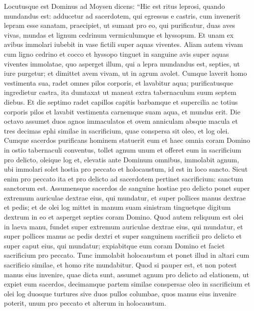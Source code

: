 \begin{biblechapter}  
\verse Locutusque est Dominus ad Moysen dicens: 
\verse “Hic est ritus leprosi, quando mundandus est: adducetur ad sacerdotem, 
\verse qui egressus e castris, cum invenerit lepram esse sanatam, 
\verse praecipiet, ut sumant pro eo, qui purificatur, duas aves vivas, mundas et lignum cedrinum vermiculumque et hyssopum. 
\verse Et unam ex avibus immolari iubebit in vase fictili super aquas viventes. 
\verse Aliam autem vivam cum ligno cedrino et cocco et hyssopo tinguet in sanguine avis super aquas viventes immolatae, 
\verse quo asperget illum, qui a lepra mundandus est, septies, ut iure purgetur; et dimittet avem vivam, ut in agrum avolet. 
\verse Cumque laverit homo vestimenta sua, radet omnes pilos corporis, et lavabitur aqua; purificatusque ingredietur castra, ita dumtaxat ut maneat extra tabernaculum suum septem diebus. 
\verse Et die septimo radet capillos capitis barbamque et supercilia ac totius corporis pilos et lavabit vestimenta carnemque suam aqua, et mundus erit. 
\verse Die octavo assumet duos agnos immaculatos et ovem anniculam absque macula et tres decimas ephi similae in sacrificium, quae conspersa sit oleo, et log olei. 
\verse Cumque sacerdos purificans hominem statuerit eum et haec omnia coram Domino in ostio tabernaculi conventus, 
\verse tollet agnum unum et offeret eum in sacrificium pro delicto, oleique log et, elevatis ante Dominum omnibus,  
\verse immolabit agnum, ubi immolari solet hostia pro peccato et holocaustum, id est in loco sancto. Sicut enim pro peccato ita et pro delicto ad sacerdotem pertinet sacrificium: sanctum sanctorum est. 
\verse Assumensque sacerdos de sanguine hostiae pro delicto ponet super extremum auriculae dextrae eius, qui mundatur, et super pollices manus dextrae et pedis; 
\verse et de olei log mittet in manum suam sinistram 
\verse tinguetque digitum dextrum in eo et asperget septies coram Domino. 
\verse Quod autem reliquum est olei in laeva manu, fundet super extremum auriculae dextrae eius, qui mundatur, et super pollices manus ac pedis dextri et super sanguinem sacrificii pro delicto 
\verse et super caput eius, qui mundatur; expiabitque eum coram Domino 
\verse et faciet sacrificium pro peccato. Tunc immolabit holocaustum 
\verse et ponet illud in altari cum sacrificio similae, et homo rite mundabitur. 
\verse Quod si pauper est, et non potest manus eius invenire, quae dicta sunt, assumet agnum pro delicto ad elationem, ut expiet eum sacerdos, decimamque partem similae conspersae oleo in sacrificium et olei log 
\verse duosque turtures sive duos pullos columbae, quos manus eius invenire poterit, unum pro peccato et alterum in holocaustum. 

\end{biblechapter}
